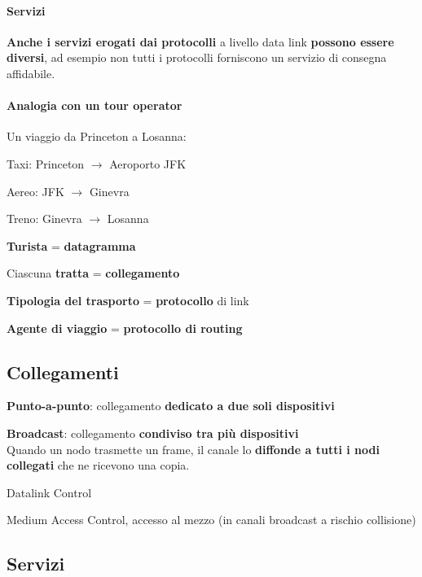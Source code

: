 \documentclass[10pt]{article}
\begin{document}
\paragraph{Servizi} \textbf{Anche i servizi erogati dai protocolli} a livello data link \textbf{possono essere diversi}, ad esempio non tutti i protocolli forniscono un servizio di consegna affidabile.
\paragraph{Analogia con un tour operator} Un viaggio da Princeton a Losanna:
\begin{list}{}{}
	\item Taxi: Princeton $\longrightarrow$ Aeroporto JFK
	\item Aereo: JFK $\longrightarrow$ Ginevra
	\item Treno: Ginevra $\longrightarrow$ Losanna
	\item
	\item \textbf{Turista} = \textbf{datagramma}
	\item Ciascuna \textbf{tratta} = \textbf{collegamento}
	\item \textbf{Tipologia del trasporto} = \textbf{protocollo} di link
	\item \textbf{Agente di viaggio} = \textbf{protocollo di routing}
\end{list}
\subsection{Collegamenti}
\begin{list}{}{\textbf{Tipologie}:}
	\item \textbf{Punto-a-punto}: collegamento \textbf{dedicato a due soli dispositivi}
	\item \textbf{Broadcast}: collegamento \textbf{condiviso tra più dispositivi}\\
	Quando un nodo trasmette un frame, il canale lo \textbf{diffonde a tutti i nodi collegati} che ne ricevono una copia.
\end{list}
\begin{list}{}{Suddividibile in due \textbf{sottolivelli}:}
	\item Datalink Control
	\item Medium Access Control, accesso al mezzo (in canali broadcast a rischio collisione)
\end{list}
\pagebreak
\subsection{Servizi}
\end{document}
